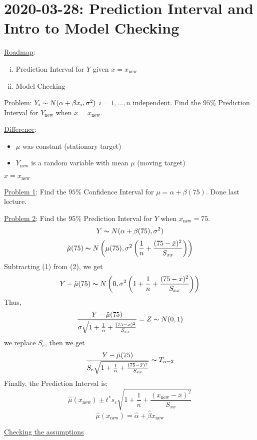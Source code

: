 \section{2020-03-28: Prediction Interval and Intro to Model Checking}
\underline{Roadmap}:
\begin{enumerate}[(i)]
    \item Prediction Interval for $ Y $ given $ x=x_{\text{new}} $
    \item Model Checking
\end{enumerate}
\underline{Problem}: $ Y_i \thicksim N(\alpha+\beta x_i,\sigma^2) $
$ i=1,\ldots ,n $ independent. Find the $ 95\% $ Prediction Interval
for $ Y_{\text{new}} $ when $ x=x_{\text{new}} $.

\underline{Difference}:
\begin{itemize}
    \item $ \mu $ was constant (stationary target)
    \item $ Y_{\text{new}} $ is a random variable with mean $ \mu $
          (moving target)
\end{itemize}

\begin{exbox}
    \begin{example}
        $ x=x_{\text{new}} $

        \underline{Problem 1}: Find the $ 95\% $ Confidence Interval for
        $ \mu=\alpha+\beta(75) $. Done last lecture.

        \underline{Problem 2}: Find the $ 95\% $ Prediction Interval for
        $ Y $ when $ x_{\text{new}}=75 $.
        \begin{equation}
            Y \thicksim N(\alpha+\beta(75),\sigma^2)
        \end{equation}
        \begin{equation}
            \tilde{\mu}(75) \thicksim N
            \left(\mu(75),\sigma^2\left( \frac{1}{n} +
                \frac{(75-\bar{x})^2}{S_{xx}} \right)\right)
        \end{equation}
        Subtracting (1) from (2), we get
        \[ Y-\tilde{\mu}(75) \thicksim N\left( 0, \sigma^2\left(
                1+\frac{1}{n} + \frac{(75-\bar{x})^2}{S_{xx}} \right) \right)\]
        Thus,
        \[ \frac{Y-\tilde{\mu}(75)}
            {\sigma\sqrt{1+\frac{1}{n} + \frac{(75-\bar{x})^2}{S_{xx}}}}=
            Z \thicksim N(0,1)  \]
        we replace $ S_e $, then we get
        \[ \frac{Y-\tilde{\mu}(75)}
            {S_e\sqrt{1+\frac{1}{n} + \frac{(75-\bar{x})^2}{S_{xx}}}} \thicksim
            T_{n-2} \]
        Finally, the Prediction Interval is:
        \[ \hat{\mu}(x_{\text{new}})\pm
            t^* s_e
            \sqrt{1+\frac{1}{n} + \frac{(x_{\text{new}}-\bar{x})^2}{S_{xx}}} \]
        \[ \hat{\mu}(x_{\text{new}})=\hat{\alpha}+\hat{\beta}x_{\text{new}} \]
    \end{example}
\end{exbox}
\underline{Checking the assumptions}

